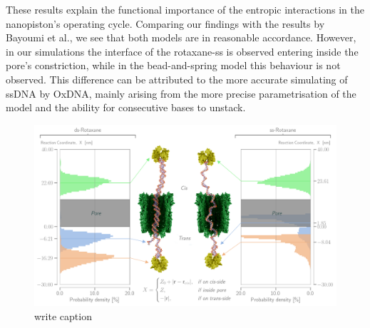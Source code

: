 These results explain the functional importance of the entropic interactions in the
nanopiston's operating cycle. Comparing our findings with the results by Bayoumi et al.,
we see that both models are in reasonable accordance. However, in our simulations the
interface of the rotaxane-ss is observed entering inside the pore's constriction, while
in the bead-and-spring model this behaviour is not observed. This difference can be
attributed to the more accurate simulating of ssDNA by OxDNA, mainly arising from the
more precise parametrisation of the model and the ability for consecutive bases to
unstack.

\begin{figure}[ht!]
\begin{center}
  \includegraphics[width=1\textwidth]{Figures/RotaxaneFluctuations.png}
  \caption{write caption}
\end{center}
\end{figure}
